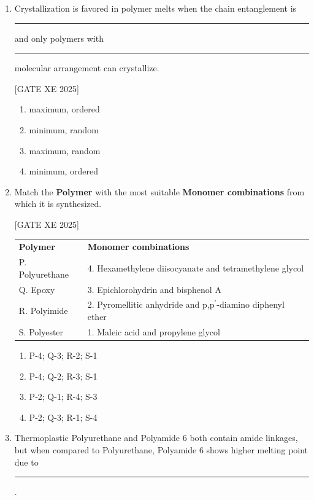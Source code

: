 \documentclass[journal,12pt,onecolumn]{IEEEtran}
\theoremstyle{remark}
\begin{document}
\begin{enumerate}
\item Crystallization is favored in polymer melts when the chain entanglement is \rule{3cm}{0.15mm} and only polymers with \rule{3cm}{0.15mm} molecular arrangement can crystallize.

\hfill[GATE XE 2025]

\begin{multicols}{2}
\begin{enumerate}
\item maximum, ordered
\item minimum, random
\item maximum, random
\item minimum, ordered
\end{enumerate}
\end{multicols}

\item Match the \textbf{Polymer} with the most suitable \textbf{Monomer combinations} from which it is synthesized.

\hfill[GATE XE 2025]

\begin{center}
\begin{tabular}{l l}
\textbf{Polymer} & \textbf{Monomer combinations} \\
P. Polyurethane & 4. Hexamethylene diisocyanate and tetramethylene glycol \\
Q. Epoxy & 3. Epichlorohydrin and bisphenol A \\
R. Polyimide & 2. Pyromellitic anhydride and p,p$^\prime$-diamino diphenyl ether \\
S. Polyester & 1. Maleic acid and propylene glycol \\
\end{tabular}
\end{center}

\begin{multicols}{2}
\begin{enumerate}
\item P-4; Q-3; R-2; S-1
\item P-4; Q-2; R-3; S-1
\item P-2; Q-1; R-4; S-3
\item P-2; Q-3; R-1; S-4
\end{enumerate}
\end{multicols}

\item Thermoplastic Polyurethane and Polyamide 6 both contain amide linkages, but when compared to Polyurethane, Polyamide 6 shows higher melting point due to \rule{3cm}{0.15mm}.


\end{enumerate}
\end{document}

